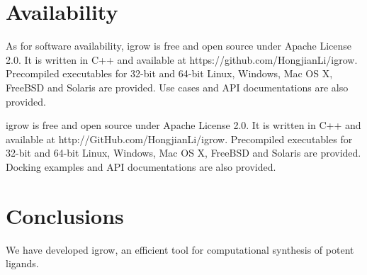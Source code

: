 \documentclass[10pt, conference, compsocconf]{IEEEtran}
\begin{document}
\section{Availability}

As for software availability, igrow is free and open source under Apache License 2.0. It is written in C++ and available at https://github.com/HongjianLi/igrow. Precompiled executables for 32-bit and 64-bit Linux, Windows, Mac OS X, FreeBSD and Solaris are provided. Use cases and API documentations are also provided.

igrow is free and open source under Apache License 2.0. It is written in C++ and available at http://GitHub.com/HongjianLi/igrow. Precompiled executables for 32-bit and 64-bit Linux, Windows, Mac OS X, FreeBSD and Solaris are provided. Docking examples and API documentations are also provided.

\section{Conclusions}

We have developed igrow, an efficient tool for computational synthesis of potent ligands.



\end{document}
